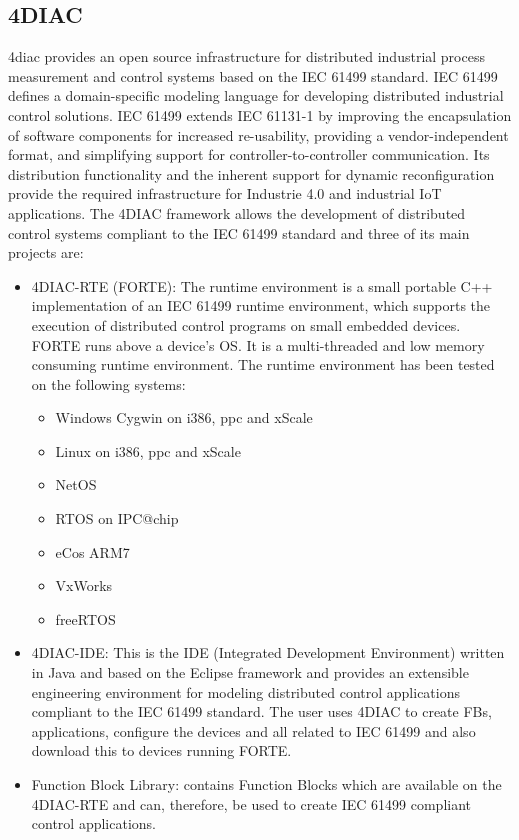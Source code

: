 \subsection{4DIAC}\label{app:4DIAC}
%
4diac provides an open source infrastructure for distributed industrial process measurement and control systems based on the IEC 61499 standard. IEC 61499 defines a domain-specific
modeling language for developing distributed industrial control solutions. IEC 61499 extends IEC 61131-1 by improving the encapsulation of software components for increased re-usability, 
providing a vendor-independent format, and simplifying support for controller-to-controller communication. Its distribution functionality and the inherent support for dynamic reconfiguration 
provide the required infrastructure for Industrie 4.0 and industrial IoT applications.
%
The 4DIAC framework allows the development of distributed control systems compliant to the IEC 61499 standard and three of its main projects are:
%
\begin{itemize}
  \item 4DIAC-RTE (FORTE): The runtime environment is a small portable C++ implementation of an IEC 61499 runtime environment, which supports the execution of distributed control programs 
  on small embedded devices. FORTE runs above a device's OS. It is a multi-threaded and low memory consuming runtime environment. The runtime environment has been tested on the following systems:
  \begin{itemize}
    \item Windows Cygwin on i386, ppc and xScale
    \item Linux on i386, ppc and xScale
    \item NetOS
    \item RTOS on IPC@chip
    \item eCos ARM7
    \item VxWorks
    \item freeRTOS
  \end{itemize}     
  \item 4DIAC-IDE: This is the IDE (Integrated Development Environment) written in Java and based on the Eclipse framework and provides an extensible engineering environment for modeling 
  distributed control applications compliant to the IEC 61499 standard. The user uses 4DIAC to create FBs, applications, configure the devices and all related to IEC 61499 and also download this 
  to devices running FORTE.
  \item Function Block Library: contains Function Blocks which are available on the 4DIAC-RTE and can, therefore, be used to create IEC 61499 compliant control applications.
\end{itemize}
